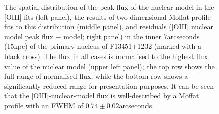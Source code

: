 \begin{figure}[!t]
\begin{subfigure}[t]{0.3\linewidth}
    \end{subfigure}
    \caption[The spatial distribution of the peak flux of the {[}OIII{]} nuclear model, a two-dimensional Moffat profile fit to this distribution, and the residuals of this fit in the inner 7\;arcseconds (15\;kpc) of the primary nucleus of F13451+1232.]{The spatial distribution of the peak flux of the nuclear model in the [OIII] fits (left panel), the results of two-dimensional Moffat profile fits to this distribution (middle panel), and residuals ([OIII] nuclear model peak flux $-$ model; right panel) in the inner 7\;arcseconds (15\;kpc) of the primary nucleus of F13451+1232 (marked with a black cross). The flux in all cases is normalised to the highest flux value of the nuclear model (upper left panel); the top row shows the full range of normalised flux, while the bottom row shows a significantly reduced range for presentation purposes. It can be seen that the [OIII]-nuclear-model flux is well-described by a Moffat profile with an FWHM of $0.74\pm0.02$\;arcseconds.}
    \label{fig: muse_f13451_1232: analysis_and_results: seeing: nuclear_model_psf}
\end{figure}


